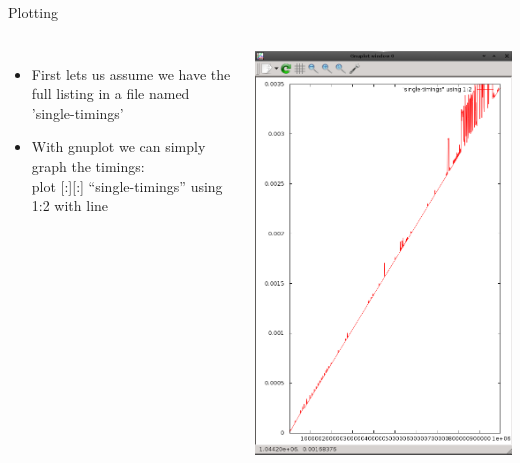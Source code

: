 \documentclass{beamer}
\begin{document}
\begin{frame}{Plotting}
\begin{columns}
\begin{itemize}
\item First lets us assume we have the full listing in a file named 'single-timings'
\item With gnuplot we can simply graph the timings: \\
plot [:][:] ``single-timings'' using 1:2 with line
\end{itemize}
\includegraphics[width=1.0\textwidth]{../imgs/timings1.png}
\end{columns}
\end{frame}
\end{document}
